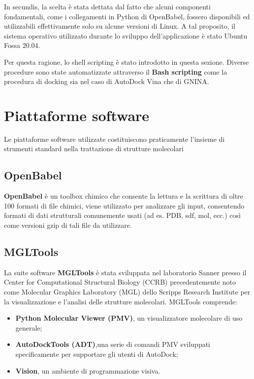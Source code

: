 In secundis, la scelta è stata dettata dal fatto che alcuni componenti fondamentali, come i collegamenti in Python di OpenBabel, fossero disponibili ed utilizzabili effettivamente solo su alcune versioni di Linux. A tal proposito, il sistema operativo utilizzato 
durante lo sviluppo dell'applicazione è stato Ubuntu Fossa 20.04.

Per questa ragione, lo shell scripting è stato introdotto in questa sezione. Diverse procedure sono state automatizzate attraverso il \textbf{Bash scripting} come la procedura di docking sia nel caso di AutoDock Vina che di GNINA.


\section{Piattaforme software}
Le piattaforme software utilizzate costituiscono praticamente l'insieme di strumenti standard nella trattazione di strutture molecolari

\subsection{OpenBabel}
\textbf{OpenBabel} è un toolbox chimico che consente la lettura e la scrittura di oltre 100 formati di file chimici, viene utilizzato per analizzare gli input, consentendo formati di dati strutturali comunemente usati (ad es. PDB, sdf, mol, ecc.) così come versioni gzip di tali file da utilizzare.


\subsection{MGLTools} 
La suite software \textbf{MGLTools} è stata sviluppata nel laboratorio Sanner presso il Center for Computational Structural Biology (CCRB) precedentemente noto come Molecular Graphics Laboratory (MGL) dello Scripps Research Institute per la visualizzazione e l'analisi delle strutture molecolari. MGLTools comprende:
\begin{itemize}
    \item \textbf{Python Molecular Viewer (PMV)}, un visualizzatore molecolare di uso generale;
    \item \textbf{AutoDockTools (ADT)},una serie di comandi PMV sviluppati specificamente per supportare gli utenti di AutoDock;
    \item \textbf{Vision}, un ambiente di programmazione visiva.
\end{itemize}

